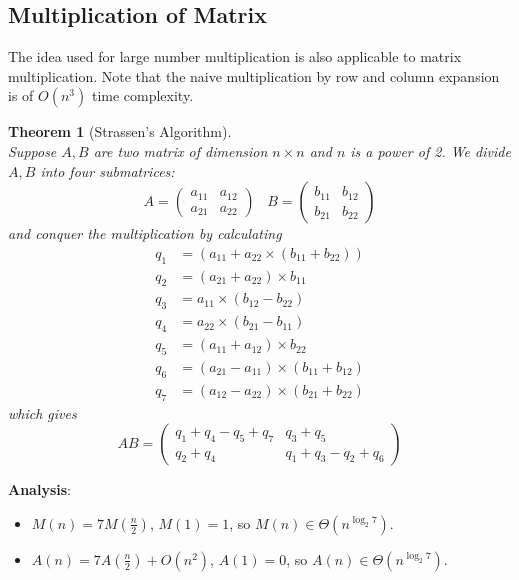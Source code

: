 \documentclass[12pt]{article}
\newtheorem{theorem}{Theorem}[section]
\theoremstyle{definition}
\newcommand{\T}{\Theta}
\begin{document}
\subsection{Multiplication of Matrix}
The idea used for large number multiplication is also applicable to matrix multiplication. Note that the naive multiplication by row and column expansion is of $O(n^3)$ time complexity.
\begin{theorem}[Strassen's Algorithm]
\hfill\\\normalfont Suppose $A, B$ are two matrix of dimension $n\times n$ and $n$ is a power of 2. 
We divide $A, B$ into four submatrices:
\[
A=\begin{pmatrix} a_{11}&a_{12}\\a_{21}&a_{22}\end{pmatrix}\;\;\;B=\begin{pmatrix} b_{11}&b_{12}\\b_{21}&b_{22}\end{pmatrix}
\]
and conquer the multiplication by calculating
\begin{align*}
q_1&=(a_{11}+a_{22}\times(b_{11}+b_{22}))\\
q_2&=(a_{21}+a_{22})\times b_11\\
q_3&=a_{11}\times(b_{12}-b_{22})\\
q_4&=a_{22}\times(b_{21}-b_{11})\\
q_5&=(a_{11}+a_{12})\times b_{22}\\
q_6&=(a_{21}-a_{11})\times(b_{11}+b_{12})\\
q_7&=(a_{12}-a_{22})\times(b_{21}+b_{22})
\end{align*}
which gives
\[
AB = \begin{pmatrix}
q_1+q_4-q_5+q_7 & q_3+q_5\\\hline
q_2+q_4 & q_1+q_3-q_2+q_6
\end{pmatrix}
\]
\end{theorem}
\textbf{Analysis}:\\
\begin{itemize}
	\item $M(n)=7M(\frac{n}{2})$, $M(1)=1$, so $M(n)\in \T(n^{\log_2 7})$.
	\item $A(n)=7A(\frac{n}{2})+O(n^2)$, $A(1)=0$, so $A(n)\in \T(n^{\log_2 7})$.
\end{itemize}
\end{document}
